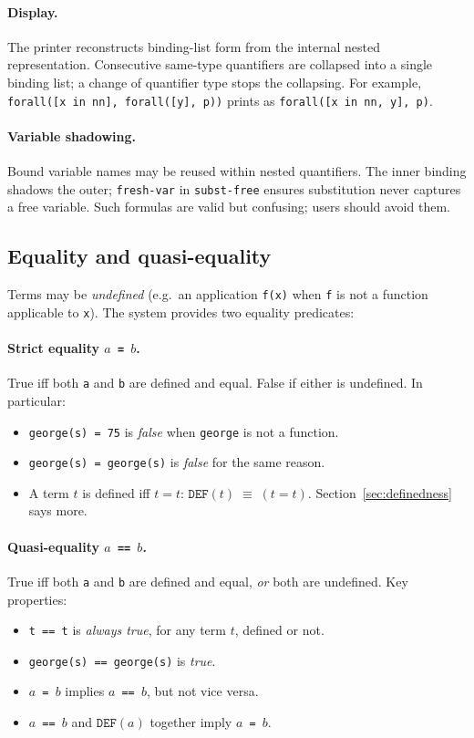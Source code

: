 \paragraph{Display.}
The printer reconstructs binding-list form from the internal nested
representation.  Consecutive same-type quantifiers are collapsed into
a single binding list; a change of quantifier type stops the collapsing.
For example, \texttt{forall([x in nn], forall([y], p))} prints as
\texttt{forall([x in nn, y], p)}.

\paragraph{Variable shadowing.}
Bound variable names may be reused within nested quantifiers.
The inner binding shadows the outer; \texttt{fresh-var} in
\texttt{subst-free} ensures substitution never captures a free variable.
Such formulas are valid but confusing; users should avoid them.

\subsection{Equality and quasi-equality}
\label{sec:equality}

Terms may be \emph{undefined} (e.g.\ an application \texttt{f(x)} when
\texttt{f} is not a function applicable to \texttt{x}).  The system
provides two equality predicates:

\paragraph{Strict equality \texttt{$a$ = $b$}.}
True iff both \texttt{a} and \texttt{b} are defined and equal.
False if either is undefined.  In particular:
\begin{itemize}
\item \texttt{george(s) = 75} is \emph{false} when \texttt{george}
  is not a function.
\item \texttt{george(s) = george(s)} is \emph{false} for the same
  reason.
\item A term $t$ is defined iff $t = t$:
  $\mathtt{DEF}(t) \;\equiv\; (t = t)$.  Section~\ref{sec:definedness}
  says more.
\end{itemize}


\paragraph{Quasi-equality \texttt{$a$ == $b$}.}
True iff both \texttt{a} and \texttt{b} are defined and equal, \emph{or}
both are undefined.  Key properties:
\begin{itemize}
\item \texttt{t == t} is \emph{always true}, for any term $t$,
  defined or not.
\item \texttt{george(s) == george(s)} is \emph{true}.
\item \texttt{$a$ = $b$} implies \texttt{$a$ == $b$}, but not vice versa.
\item \texttt{$a$ == $b$} and $\mathtt{DEF}(a)$ together imply
  \texttt{$a$ = $b$}.
\end{itemize}

